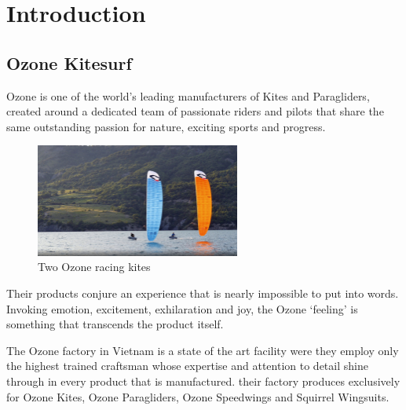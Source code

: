 
\chapter{Introduction} 	%
\label{Introduction} 		%


\section{Ozone Kitesurf}
\label{sec:In1.1}

Ozone is one of the world’s leading manufacturers of Kites and Paragliders, created around a dedicated team of passionate riders and pilots that share the same outstanding passion for nature, exciting sports and progress.

\begin{figure}
\centering
    \includegraphics[width=0.6\textwidth]{figures/introduction/two_ozone_kite.png}
    \caption{Two Ozone racing kites}
    \label{fig:Two_Ozone_racing_kite}
\end{figure}



Their products conjure an experience that is nearly impossible to put into words. Invoking emotion, excitement, exhilaration and joy, the Ozone ‘feeling’ is something that transcends the product itself.

The Ozone factory in Vietnam is a state of the art facility were they employ only the highest trained craftsman whose expertise and attention to detail shine through in every product that is manufactured. their factory produces exclusively for Ozone Kites, Ozone Paragliders, Ozone Speedwings and Squirrel Wingsuits.

